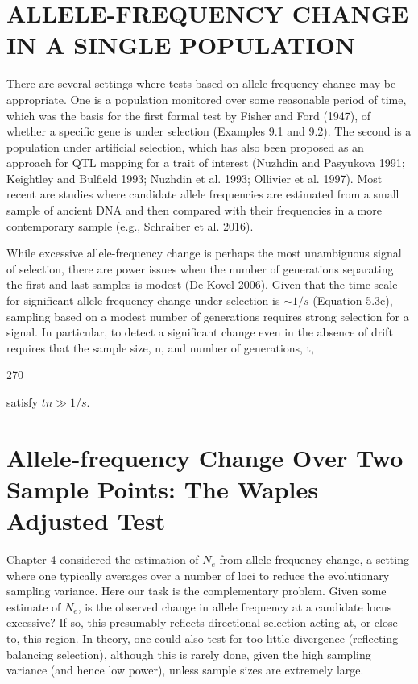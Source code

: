 \documentclass{article}
\begin{document}
\section{ALLELE-FREQUENCY CHANGE IN A SINGLE POPULATION}
There are several settings where tests based on allele-frequency change may be appropriate. One is a population monitored over some reasonable period of time, which was the basis for the first formal test by Fisher and Ford (1947), of whether a specific gene is under selection (Examples 9.1 and 9.2). The second is a population under artificial selection, which has also been proposed as an approach for QTL mapping for a trait of interest (Nuzhdin and Pasyukova 1991; Keightley and Bulfield 1993; Nuzhdin et al. 1993; Ollivier et al. 1997). Most recent are studies where candidate allele frequencies are estimated from a small sample of ancient DNA and then compared with their frequencies in a more contemporary sample (e.g., Schraiber et al. 2016).

While excessive allele-frequency change is perhaps the most unambiguous signal of selection, there are power issues when the number of generations separating the first and last samples is modest (De Kovel 2006). Given that the time scale for significant allele-frequency change under selection is  $ \sim1/s $ (Equation 5.3c), sampling based on a modest number of generations requires strong selection for a signal. In particular, to detect a significant change even in the absence of drift requires that the sample size, n, and number of generations, t,

270

satisfy  $ tn \gg 1/s $.

\section{Allele-frequency Change Over Two Sample Points: The Waples Adjusted Test}
Chapter 4 considered the estimation of  $ N_{e} $ from allele-frequency change, a setting where one typically averages over a number of loci to reduce the evolutionary sampling variance. Here our task is the complementary problem. Given some estimate of  $ N_{e} $, is the observed change in allele frequency at a candidate locus excessive? If so, this presumably reflects directional selection acting at, or close to, this region. In theory, one could also test for too little divergence (reflecting balancing selection), although this is rarely done, given the high sampling variance (and hence low power), unless sample sizes are extremely large.
\end{document}
